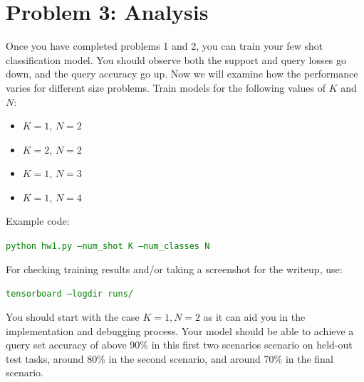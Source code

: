 \documentclass[12pt]{article}
\begin{document}
    \section*{Problem 3: Analysis}

    Once you have completed problems 1 and 2, you can train your few shot classification model. You should observe both the support and query losses go down, and the query accuracy go up. Now we will examine how the performance varies for different size problems.
    Train models for the following values of $K$ and $N$:
    \begin{itemize}
        \item $K = 1$, $N=2$ %
        \item $K = 2$, $N=2$ %
        \item $K = 1$, $N=3$ %
        \item $K = 1$, $N=4$ %
    \end{itemize}

    Example code:

    \textcolor{green}{\texttt{python hw1.py --num\_shot K --num\_classes N}}

    For checking training results and/or taking a screenshot for the writeup, use:

    \textcolor{green}{\texttt{tensorboard --logdir runs/}}

    You should start with the case $K=1 , N=2$ as it can aid you in the implementation and debugging process. Your model should be able to achieve a query set accuracy of above 90\% in this first two scenarios scenario on held-out test tasks, around 80\% in the second scenario, and around 70\% in the final scenario.
\end{document}
